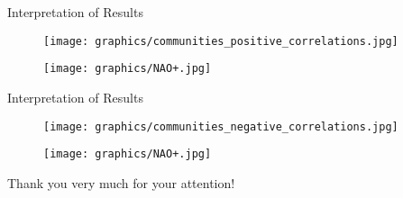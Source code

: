 \documentclass[xcolor=dvipsnames, aspectratio=169]{beamer}
\begin{document}
    \begin{comment}
        - adjacency matrix
    \end{comment}
 
    
    \begin{comment}
        - We can see NAO "lower part" in the graph with positive correlations
        - We can see that the two parts of NAO anticorrelate
    \end{comment}
    \begin{frame}{Interpretation of Results}
        \hspace{.4cm}
        \begin{minipage}{.55\paperwidth}
            \begin{figure}
                \centering
                \texttt{[image: graphics/communities\_positive\_correlations.jpg]}
            \end{figure}
        \end{minipage}
        \hspace{.3cm}
        \begin{minipage}{.3\paperwidth}
            \begin{figure}
                \centering
                \texttt{[image: graphics/NAO+.jpg]}
            \end{figure}
        \end{minipage}
        
    \end{frame}
    
    \begin{frame}{Interpretation of Results}
        \hspace{.4cm}
        \begin{minipage}{.55\paperwidth}
            \begin{figure}
                \centering
                \texttt{[image: graphics/communities\_negative\_correlations.jpg]}
            \end{figure}
        \end{minipage}
        \hspace{.3cm}
        \begin{minipage}{.3\paperwidth}
            \begin{figure}
                \centering
                \texttt{[image: graphics/NAO+.jpg]}
            \end{figure}
        \end{minipage}
        
    \end{frame}
    
    \begin{frame}{}
    \centering
    \begin{Large}
        Thank you very much for your attention!
    \end{Large}
        
    \end{frame}
  
\end{document}
